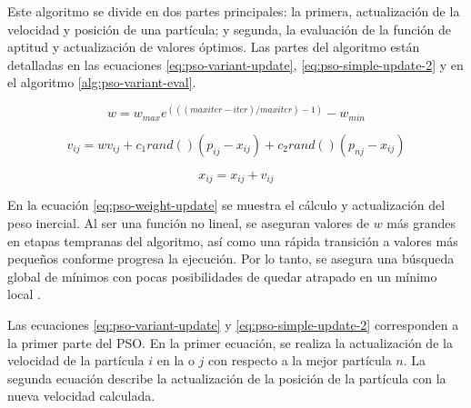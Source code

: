 \documentclass[letterpaper]{report}
\begin{document}
    Este algoritmo se divide en dos
    partes principales: la primera, actualización de la velocidad y posición de
    una partícula; y segunda, la evaluación de la función de aptitud y
    actualización de valores óptimos. Las partes del algoritmo están detalladas
    en las ecuaciones \ref{eq:pso-variant-update}, \ref{eq:pso-simple-update-2}
    y en el algoritmo \ref{alg:pso-variant-eval}.

    \begin{equation}
      \label{eq:pso-weight-update}
      w = w_{max} e^{(((maxiter - iter) / maxiter) - 1)} - w_{min} 
    \end{equation}

    \begin{equation}
      v_{ij} = w v_{ij} + c_1 rand()(p_{ij} - x_{ij}) + c_2 rand()(p_{nj}
        - x_{ij})
      \label{eq:pso-variant-update}
    \end{equation}

    \begin{equation}
      x_{ij} = x_{ij} + v_{ij}
      \label{eq:pso-simple-update-2}
    \end{equation}

    En la ecuación \ref{eq:pso-weight-update} se muestra el cálculo y
    actualización del peso inercial. Al ser una función no lineal, se aseguran
    valores de $w$ más grandes en etapas tempranas del algoritmo, así como una
    rápida transición a valores más pequeños conforme progresa la ejecución. Por
    lo tanto, se asegura una búsqueda global de mínimos con pocas posibilidades
    de quedar atrapado en un mínimo local \cite{APSO2016}. 

    Las ecuaciones \ref{eq:pso-variant-update} y \ref{eq:pso-simple-update-2}
    corresponden a la primer parte del PSO. En la primer ecuación, se realiza la
    actualización de la velocidad de la partícula $i$ en la o $j$ con
    respecto a la mejor partícula $n$. La segunda ecuación describe la
    actualización de la posición de la partícula con la nueva velocidad
    calculada.
\end{document}
